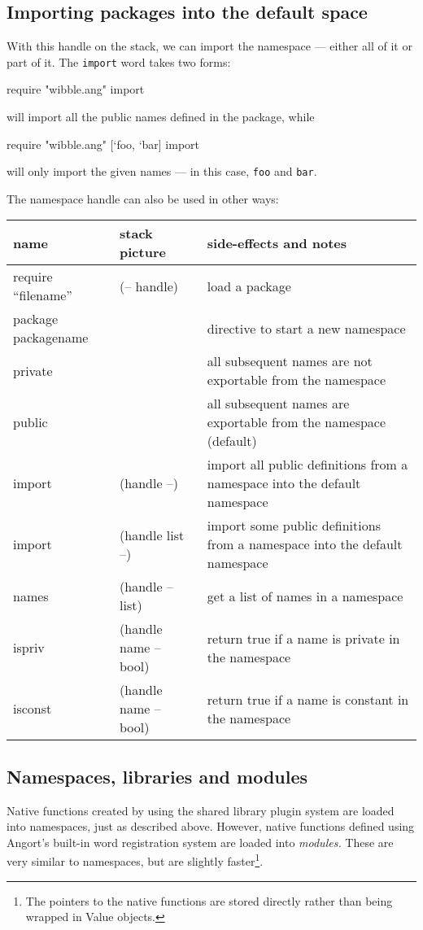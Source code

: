 \subsection{Importing packages into the default space}
With this handle on the stack, we can import the namespace --- either
all of it or part of it. The \texttt{import} word takes two forms:
\begin{v}
require "wibble.ang" import
\end{v}
will import all the public names defined in the package, while
\begin{v}
require "wibble.ang" [`foo, `bar] import
\end{v}
will only import the given names --- in this case, \texttt{foo} and \texttt{bar}.

The namespace handle can also be used in other ways:
\begin{center}
\begin{tabular}{|l|l|p{3in}|}\hline
\textbf{name} & \textbf{stack picture} & \textbf{side-effects and notes}\\ \hline
require ``filename'' & (-- handle) & load a package\\
package packagename & & directive to start a new namespace \\
private & & all subsequent names are not exportable from the namespace\\
public & & all subsequent names are exportable from the namespace (default)\\\hline
import &(handle --) & import all public definitions from a namespace into the default namespace\\
import &(handle list --) & import some public definitions from a namespace into the default namespace\\
names & (handle -- list) & get a list of names in a namespace\\
ispriv & (handle name -- bool) & return true if a name is private in the namespace\\
isconst & (handle name -- bool) & return true if a name is constant in the namespace\\
\hline
\end{tabular}
\end{center}

\subsection{Namespaces, libraries and modules}
Native functions created by using the shared library plugin system
are loaded into namespaces, just as described above. However, native
functions defined using Angort's built-in word registration system
are loaded into \emph{modules.} These are very similar to namespaces,
but are slightly faster\footnote{The pointers to the native functions
are stored directly rather than being wrapped in Value objects.}. 

